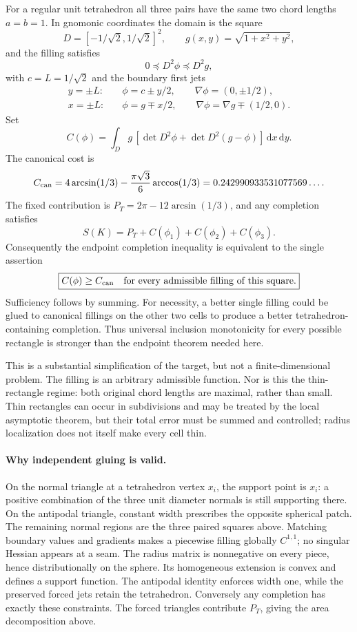 \documentclass[11pt]{article}
\theoremstyle{remark}\newtheorem{remark}[theorem]{Remark}
\newcommand{\dd}{\,\mathrm d}
\begin{document}
For a regular unit tetrahedron all three pairs have the same two chord lengths $a=b=1$. In gnomonic coordinates the domain is the square
\[
 D=[-1/\sqrt2,1/\sqrt2]^2,\qquad g(x,y)=\sqrt{1+x^2+y^2},
\]
and the filling satisfies
\begin{equation}\label{endpoint:split}
 0\preceq D^2\phi\preceq D^2g,
\end{equation}
with $c=L=1/\sqrt2$ and the boundary first jets
\begin{align*}
 y=\pm L:&\quad \phi=c\pm y/2,\qquad \nabla\phi=(0,\pm1/2),\\
 x=\pm L:&\quad \phi=g\mp x/2,\qquad \nabla\phi=\nabla g\mp(1/2,0).
\end{align*}
Set
\[
 C(\phi)=\int_Dg\,[\det D^2\phi+\det D^2(g-\phi)]\dd x\dd y.
\]
The canonical cost is
\begin{equation}\label{endpoint:canonical}
 C_{\rm can}=4\arcsin(1/3)-\frac{\pi\sqrt3}{6}\arccos(1/3)
 =0.242990933531077569\ldots.
\end{equation}
The fixed contribution is $P_T=2\pi-12\arcsin(1/3)$, and any completion satisfies
\[
 S(K)=P_T+C(\phi_1)+C(\phi_2)+C(\phi_3).
\]
Consequently the endpoint completion inequality is equivalent to the single assertion
\begin{equation}\label{endpoint:squaretarget}
 \boxed{C(\phi)\geq C_{\rm can}\quad\hbox{for every admissible filling of this square}.}
\end{equation}
Sufficiency follows by summing. For necessity, a better single filling could be glued to canonical fillings on the other two cells to produce a better tetrahedron-containing completion. Thus universal inclusion monotonicity for every possible rectangle is stronger than the endpoint theorem needed here.

This is a substantial simplification of the target, but not a finite-dimensional problem. The filling is an arbitrary admissible function. Nor is this the thin-rectangle regime: both original chord lengths are maximal, rather than small. Thin rectangles can occur in subdivisions and may be treated by the local asymptotic theorem, but their total error must be summed and controlled; radius localization does not itself make every cell thin.

\paragraph{Why independent gluing is valid.}
On the normal triangle at a tetrahedron vertex $x_i$, the support point is $x_i$: a positive combination of the three unit diameter normals is still supporting there. On the antipodal triangle, constant width prescribes the opposite spherical patch. The remaining normal regions are the three paired squares above. Matching boundary values and gradients makes a piecewise filling globally $C^{1,1}$; no singular Hessian appears at a seam. The radius matrix is nonnegative on every piece, hence distributionally on the sphere. Its homogeneous extension is convex and defines a support function. The antipodal identity enforces width one, while the preserved forced jets retain the tetrahedron. Conversely any completion has exactly these constraints. The forced triangles contribute $P_T$, giving the area decomposition above.
\end{document}

